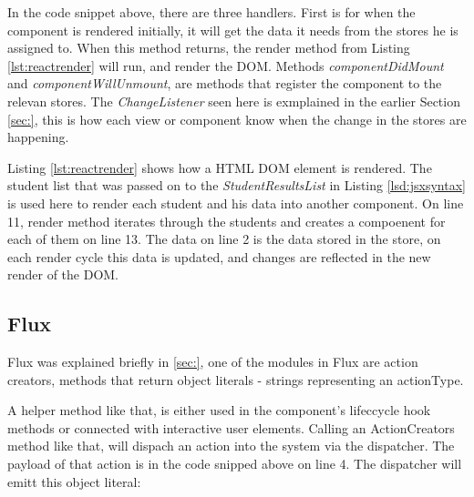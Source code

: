 

In the code snippet above, there are three handlers. First is for when the component is rendered initially, it will get the data it needs from the stores he is assigned to. When this method returns, the render method from Listing \ref{lst:reactrender} will run, and render the DOM. Methods \emph{componentDidMount} and \emph{componentWillUnmount}, are methods that register the component to the relevan stores. The \emph{ChangeListener} seen here is exmplained in the earlier Section \ref{sec:}, this is how each view or component know when the change in the stores are happening.



Listing \ref{lst:reactrender} shows how a HTML DOM element is rendered. The student list that was passed on to the \emph{StudentResultsList} in Listing \ref{lsd:jsxsyntax} is used here to render each student and his data into another component. On line 11, render method iterates through the students and creates a compoenent for each of them on line 13. The data on line 2 is the data stored in the store, on each render cycle this data is updated, and changes are reflected in the new render of the DOM.

\subsection{Flux}
Flux was explained briefly in \ref{sec:}, one of the modules in Flux are action creators, methods that return object literals - strings representing an actionType.



A helper method like that, is either used in the component's lifeccycle hook methods or connected with interactive user elements. Calling an ActionCreators method like that, will dispach an action into the system via the dispatcher. The payload of that action is in the code snipped above on line 4. The dispatcher will emitt this object literal:



